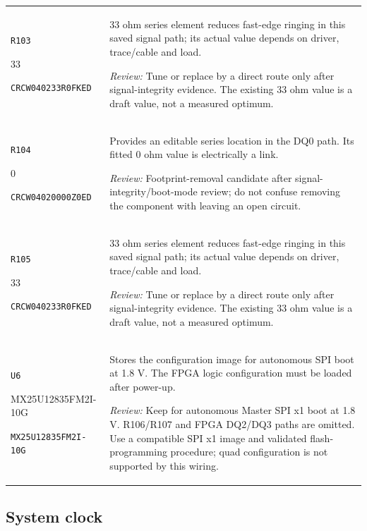 \documentclass[10pt,a4paper]{article}
\begin{document}
\begin{longtable}{@{}P{46mm}P{117mm}@{}}
\nolinkurl{R103}\par 33\par\scriptsize \nolinkurl{CRCW040233R0FKED} & 33 ohm series element reduces fast-edge ringing in this saved signal path; its actual value depends on driver, trace/cable and load.\par\smallskip\textit{Review:} Tune or replace by a direct route only after signal-integrity evidence. The existing 33 ohm value is a draft value, not a measured optimum. \\
\nolinkurl{R104}\par 0\par\scriptsize \nolinkurl{CRCW04020000Z0ED} & Provides an editable series location in the DQ0 path. Its fitted 0 ohm value is electrically a link.\par\smallskip\textit{Review:} Footprint-removal candidate after signal-integrity/boot-mode review; do not confuse removing the component with leaving an open circuit. \\
\nolinkurl{R105}\par 33\par\scriptsize \nolinkurl{CRCW040233R0FKED} & 33 ohm series element reduces fast-edge ringing in this saved signal path; its actual value depends on driver, trace/cable and load.\par\smallskip\textit{Review:} Tune or replace by a direct route only after signal-integrity evidence. The existing 33 ohm value is a draft value, not a measured optimum. \\
\nolinkurl{U6}\par MX25U12835FM2I-10G\par\scriptsize \nolinkurl{MX25U12835FM2I-10G} & Stores the configuration image for autonomous SPI boot at 1.8 V. The FPGA logic configuration must be loaded after power-up.\par\smallskip\textit{Review:} Keep for autonomous Master SPI x1 boot at 1.8 V. R106/R107 and FPGA DQ2/DQ3 paths are omitted. Use a compatible SPI x1 image and validated flash-programming procedure; quad configuration is not supported by this wiring. \\
\end{longtable}\endgroup

\Needspace{35mm}\subsection{System clock}
\end{document}
